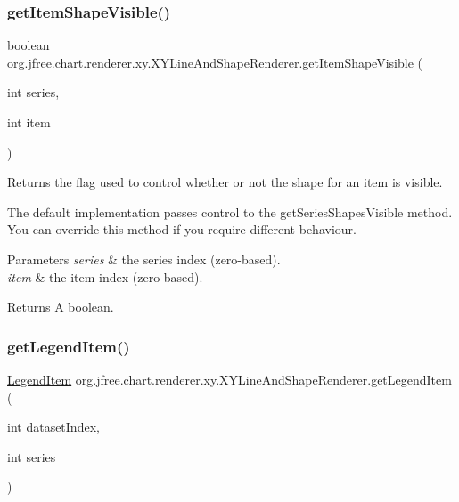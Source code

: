 \subsubsection{\texorpdfstring{get\+Item\+Shape\+Visible()}{getItemShapeVisible()}}
{\footnotesize\ttfamily boolean org.\+jfree.\+chart.\+renderer.\+xy.\+X\+Y\+Line\+And\+Shape\+Renderer.\+get\+Item\+Shape\+Visible (\begin{DoxyParamCaption}\item[{int}]{series,  }\item[{int}]{item }\end{DoxyParamCaption})}

Returns the flag used to control whether or not the shape for an item is visible. 

The default implementation passes control to the {\ttfamily get\+Series\+Shapes\+Visible} method. You can override this method if you require different behaviour.


\begin{DoxyParams}{Parameters}
{\em series} & the series index (zero-\/based). \\
\hline
{\em item} & the item index (zero-\/based).\\
\hline
\end{DoxyParams}
\begin{DoxyReturn}{Returns}
A boolean. 
\end{DoxyReturn}
\mbox{\label{classorg_1_1jfree_1_1chart_1_1renderer_1_1xy_1_1_x_y_line_and_shape_renderer_a28b44117b28d6414adbc8184e7756c95}} 
\subsubsection{\texorpdfstring{get\+Legend\+Item()}{getLegendItem()}}
{\footnotesize\ttfamily \mbox{\hyperlink{classorg_1_1jfree_1_1chart_1_1_legend_item}{Legend\+Item}} org.\+jfree.\+chart.\+renderer.\+xy.\+X\+Y\+Line\+And\+Shape\+Renderer.\+get\+Legend\+Item (\begin{DoxyParamCaption}\item[{int}]{dataset\+Index,  }\item[{int}]{series }\end{DoxyParamCaption})}


